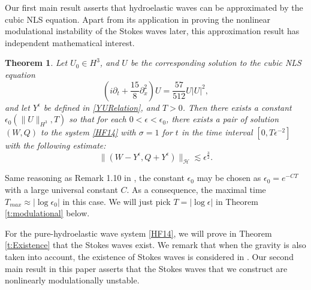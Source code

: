 \documentclass[12pt]{amsart}
\newtheorem{theorem}{Theorem}[section]
\theoremstyle{remark}
\theoremstyle{definition}
\numberwithin{equation}{section}
\newcommand{\e}{\epsilon}
\renewcommand{\H}{{\mathcal H }}
\newcommand{\f}{\frac}
\begin{document}
Our first main result asserts that hydroelastic waves can be approximated by the cubic NLS equation.
Apart from its application in proving the nonlinear modulational instability of the Stokes waves later, this approximation result has independent mathematical interest.
\begin{theorem} \label{t:NLSApproximation}
Let $U_0 \in H^3$, and $U$ be the corresponding solution to the cubic NLS equation
\begin{equation} \label{LambdaNLS}
 \left(i\partial_t + \frac{15}{8}\partial_x^2 \right) U = \frac{57}{512} U|U|^2,
\end{equation}
and let $Y^\epsilon$ be defined in \eqref{YURelation}, and $T>0$.
Then there exists a constant $\epsilon_0(\|U\|_{H^3}, T)$ so that for each $0<\epsilon< \epsilon_0$, there exists a pair of solution $(W, Q)$ to the system \eqref{HF14} with $\sigma = 1$ for $t$ in the time interval $[0, T\epsilon^{-2}]$ with the following estimate:
\begin{equation} \label{WQYEpsilonDiffBd}
 \|(W - Y^\epsilon, Q + Y^\epsilon)\|_{\H}\lesssim \epsilon^{\f32}.
\end{equation}
\end{theorem}

Same reasoning as Remark 1.10 in \cite{MR4462478}, the constant $\e_0$ may be chosen as $\e_0 = e^{-CT}$ with a large universal constant $C$.
As a consequence, the maximal time $T_{max} \approx |\log \e_0|$ in this case.
We will just pick $T = |\log \e|$ in Theorem \ref{t:modulational} below.

For the pure-hydroelastic wave system \eqref{HF14}, we will prove in Theorem \ref{t:Existence} that the Stokes waves exist.
We remark that when the gravity is also taken into account, the existence of Stokes waves is considered in \cite{MR2413099}.
Our second main result in this paper asserts that the Stokes waves that we construct are nonlinearly modulationally unstable. 
\end{document}
